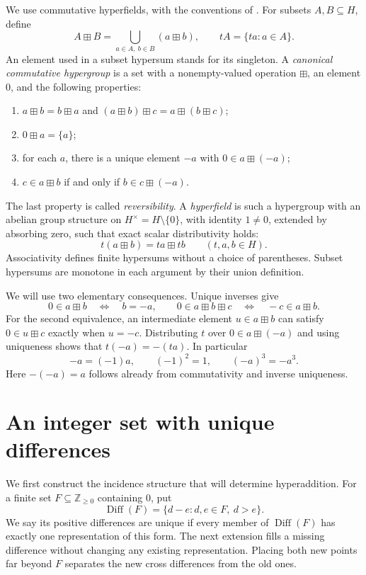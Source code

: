 \documentclass[11pt]{article}
\theoremstyle{remark}
\newcommand{\Z}{\mathbb Z}
\newcommand{\hs}{\boxplus}
\DeclareMathOperator{\Diff}{Diff}
\begin{document}
We use commutative hyperfields, with the conventions of
\cite[Definitions~2.1, 2.4 and 2.8]{BB}.
For subsets $A,B\subseteq H$, define
\[
 A\hs B=\bigcup_{a\in A,\ b\in B}(a\hs b),
 \qquad tA=\{ta:a\in A\}.
\]
An element used in a subset hypersum stands for its singleton.
A \emph{canonical commutative hypergroup} is a set with a nonempty-valued
operation $\hs$, an element $0$, and the following properties:
\begin{enumerate}
\item $a\hs b=b\hs a$ and $(a\hs b)\hs c=a\hs(b\hs c)$;
\item $0\hs a=\{a\}$;
\item for each $a$, there is a unique element $-a$ with $0\in a\hs(-a)$;
\item $c\in a\hs b$ if and only if $b\in c\hs(-a)$.
\end{enumerate}
The last property is called \emph{reversibility}.
A \emph{hyperfield} is such a hypergroup with an abelian group structure
on $H^\times=H\setminus\{0\}$, with identity $1\ne0$, extended by
absorbing zero, such that exact scalar distributivity holds:
\begin{equation}\label{eq:distributivity}
 t(a\hs b)=ta\hs tb\qquad(t,a,b\in H).
\end{equation}
Associativity defines finite hypersums without a choice of parentheses.
Subset hypersums are monotone in each argument by their union definition.

We will use two elementary consequences. Unique inverses give
\begin{equation}\label{eq:zero-test}
 0\in a\hs b\quad\Longleftrightarrow\quad b=-a,
 \qquad
 0\in a\hs b\hs c\quad\Longleftrightarrow\quad -c\in a\hs b.
\end{equation}
For the second equivalence, an intermediate element $u\in a\hs b$
can satisfy $0\in u\hs c$ exactly when $u=-c$.
Distributing $t$ over $0\in a\hs(-a)$ and using uniqueness shows that
$t(-a)=-(ta)$. In particular
\begin{equation}\label{eq:signs}
 -a=(-1)a,\qquad (-1)^2=1,\qquad (-a)^3=-a^3.
\end{equation}
Here $-(-a)=a$ follows already from commutativity and inverse uniqueness.

\section{An integer set with unique differences}\label{sec:differences}

We first construct the incidence structure that will determine
hyperaddition. For a finite set $F\subseteq\Z_{\ge0}$ containing $0$, put
\[
 \Diff(F)=\{d-e:d,e\in F,\ d>e\}.
\]
We say its positive differences are unique if every member of
$\Diff(F)$ has exactly one representation of this form.
The next extension fills a missing difference without changing any
existing representation. Placing both new points far beyond $F$
separates the new cross differences from the old ones.
\end{document}
